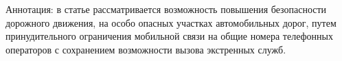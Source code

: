 Аннотация: в статье рассматривается возможность повышения безопасности дорожного движения, на особо опасных участках автомобильных дорог, путем принудительного ограничения мобильной связи на общие номера телефонных операторов с сохранением возможности вызова экстренных служб.